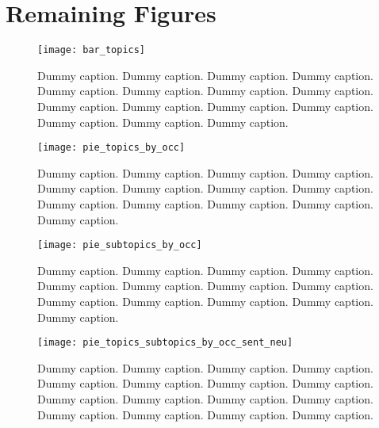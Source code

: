 \section{Remaining Figures}
\begin{figure}[h!]
    \centering
    \texttt{[image: bar\_topics]}
    \caption{
        Dummy caption.
        Dummy caption.
        Dummy caption.
        Dummy caption.
        Dummy caption.
        Dummy caption.
        Dummy caption.
        Dummy caption.
        Dummy caption.
        Dummy caption.
        Dummy caption.
        Dummy caption.
        Dummy caption.
        Dummy caption.
        Dummy caption.
    }
    \label{fig:bar_topics}
    \texttt{[image: pie\_topics\_by\_occ]}
    \caption{
        Dummy caption.
        Dummy caption.
        Dummy caption.
        Dummy caption.
        Dummy caption.
        Dummy caption.
        Dummy caption.
        Dummy caption.
        Dummy caption.
        Dummy caption.
        Dummy caption.
        Dummy caption.
        Dummy caption.
    }
    \label{fig:pie_topics_by_occ}
\end{figure}
\pagebreak
\begin{figure}[h!]
    \centering
    \texttt{[image: pie\_subtopics\_by\_occ]}
    \caption{
        Dummy caption.
        Dummy caption.
        Dummy caption.
        Dummy caption.
        Dummy caption.
        Dummy caption.
        Dummy caption.
        Dummy caption.
        Dummy caption.
        Dummy caption.
        Dummy caption.
        Dummy caption.
        Dummy caption.
    }
    \label{fig:pie_subtopics_by_occ}
    \texttt{[image: pie\_topics\_subtopics\_by\_occ\_sent\_neu]}
    \caption{
        Dummy caption.
        Dummy caption.
        Dummy caption.
        Dummy caption.
        Dummy caption.
        Dummy caption.
        Dummy caption.
        Dummy caption.
        Dummy caption.
        Dummy caption.
        Dummy caption.
        Dummy caption.
        Dummy caption.
        Dummy caption.
        Dummy caption.
        Dummy caption.
    }
    \label{fig:pie_topics_subtopics_by_occ_sent_neu}
\end{figure}
